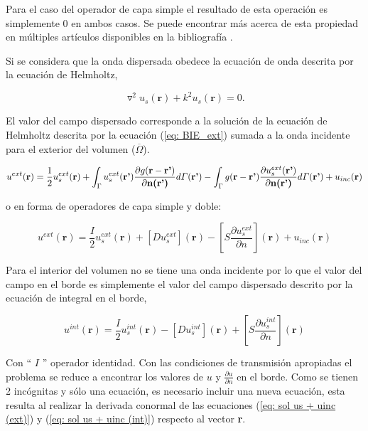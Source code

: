 \documentclass[12pt,letterpaper]{article}
\numberwithin{equation}{section}
\begin{document}
Para el caso del operador de capa simple el resultado de esta operación es simplemente $0$ en ambos casos. Se puede encontrar más acerca de esta propiedad en múltiples artículos disponibles en la bibliografía \cite{BIE_Helmholtz_1,BIE_Helmholtz_2,Multiple scattering,Multitrace_acoustic}.

Si se considera que la onda dispersada obedece la ecuación de onda descrita por la ecuación de Helmholtz,

$$\triangledown^2u_s(\textbf{r})+k^2u_s(\textbf{r})=0.$$

\pagebreak
El valor del campo dispersado corresponde a la solución de la ecuación de Helmholtz descrita por la ecuación (\ref{eq: BIE_ext}) sumada a la onda incidente para el exterior del volumen ($\overline{\Omega}$). 

\begin{equation}
u^{ext}(\textbf{r}) = \frac{1}{2}u_s^{ext}(\textbf{r}) + \int_{\Gamma}u_s^{ext}(\textbf{r'})\frac{\partial g(\textbf{r}-\textbf{r'})}{\partial\textbf{n(\textbf{r'})}}d\varGamma(\textbf{r'}) - \int_{\Gamma}g(\textbf{r}-\textbf{r'})\frac{\partial u_s^{ext}(\textbf{r'})}{\partial\textbf{n(\textbf{r'})}}d\varGamma(\textbf{r'}) +  u_{inc}(\textbf{r})
\label{eq: BIE_borde}	
\end{equation}


o en forma de operadores de capa simple y doble:

\begin{equation}
\boxed{
u^{ext}(\textbf{r})=\frac{I}{2}u_s^{ext}(\textbf{r}) + \left[D u_s^{ext}\right](\textbf{r}) - \left[S \frac{\partial u_s^{ext}}{\partial n}\right](\textbf{r}) + u_{inc}(\textbf{r})
}
\label{eq: sol us + uinc (ext)}
\end{equation}

Para el interior del volumen no se tiene una onda incidente por lo que el valor del campo en el borde es simplemente el valor del campo dispersado descrito por la ecuación de integral en el borde,

\begin{equation}
\boxed{
u^{int}(\textbf{r})= \frac{I}{2}u_s^{int}(\textbf{r}) - \left[D u_s^{int}\right](\textbf{r}) + \left[S \frac{\partial u_s^{int}}{\partial n}\right](\textbf{r})
}
\label{eq: sol us + uinc (int)}
\end{equation}

Con `` $I$ '' operador identidad. Con las condiciones de transmisión apropiadas el problema se reduce a encontrar los valores de $u$ y $\frac{\partial u}{\partial n}$ en el borde. Como se tienen 2 incógnitas y sólo una ecuación, es necesario incluir una nueva ecuación, esta resulta al realizar la derivada conormal de las ecuaciones (\ref{eq: sol us + uinc (ext)}) y (\ref{eq: sol us + uinc (int)}) respecto al vector \textbf{r}. 
\end{document}
